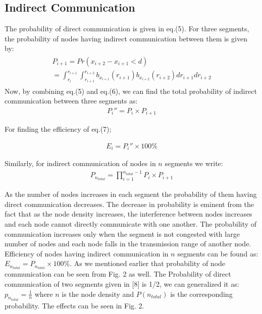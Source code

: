 \documentclass[journal]{IEEEtran}
\begin{document}
\subsection{Indirect Communication}
The probability of direct communication is given in eq.(5). For three segments, the probability of nodes having indirect communication between them is given by:
\tiny
\begin{eqnarray}
\begin{split}
P_{i+1}=Pr(x_{i+2}-x_{i+1}<d)
\\=\int_{r_{i}}^{r_{i+1}}\int_{r_{i+1}}^{r_{i+2}}b_{x_{i+1}}(r_{i+1})b_{x_{i+2 }}(r_{i+2})dr_{i+1}dr_{i+2}
\end{split}
\end{eqnarray}
\normalsize
Now, by combining eq.(5) and eq.(6), we can find the total probability of indirect communication between three segments as:
\begin{eqnarray}
P_{i}''=P_{i}\times P_{i+1}
\end{eqnarray}

For finding the efficiency of eq.(7);

\begin{eqnarray}
E_{i}=P_{i}'' \times 100\%
\end{eqnarray}

Similarly, for indirect communication of nodes in $n$ segments we write:
\begin{eqnarray}
P_{n_{total}}= \prod_{i=1}^{n_{total}-1}P_{i} \times P_{i+1}
\end{eqnarray}






As the number of nodes increases in each segment the probability of them having direct communication decreases. The decrease in probability is eminent from the fact that as the node density increases, the interference between nodes increases and each node cannot directly communicate with one another.
The probability of communication increases only when the segment is not congested with large number of nodes and each node falls in the transmission range of another node.
Efficiency of nodes having indirect communication in $n$ segments can be found as: $E_{n_{total}}=P_{n_{total}} \times 100\%$. As we mentioned earlier that probability of node communication can be seen from Fig. 2 as well. The Probability of direct communication of two segments given in [8] is 1/2, we can generalized it as: $p_{n_{total}}=\frac{1}{n}$ where $n$ is the node density and $ P(n_{total}) $ is the corresponding probability.
The effects can be seen in Fig. 2.
\end{document}
